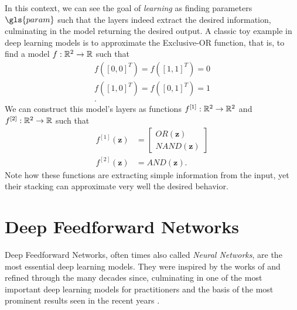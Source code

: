 In this context, we can see the goal of \textit{learning} as finding parameters $\gls{param}$ such that the layers indeed extract the desired information, culminating in the model returning the desired output.
A classic toy example in deep learning models is to approximate the Exclusive-OR function, that is, to find a model $f : \mathbb{R}^2 \to \mathbb{R}$ such that
\begin{align*}
    f([0,0]^T) = f([1,1]^T) = 0 \\
    f([1,0]^T) = f([0,1]^T) = 1 \\
.\end{align*}
We can construct this model's layers as functions $f^{[1]}:\mathbb{R}^2\to\mathbb{R}^2$ and $f^{[2]}:\mathbb{R}^2\to\mathbb{R}$ such that
\begin{align*}
    f^{[1]}(\bm{z}) &= \begin{bmatrix}
    OR(\bm{z}) \\
    NAND(\bm{z})
    \end{bmatrix} \\
    f^{[2]}(\bm{z}) &= AND(\bm{z})
.\end{align*}
Note how these functions are extracting simple information from the input, yet their stacking can approximate very well the desired behavior.

\section{Deep Feedforward Networks}\label{sec:neural-nets}

Deep Feedforward Networks, often times also called \emph{Neural Networks}\footnotemark, are the most essential deep learning models.
They were inspired by the works of \textcite{rosenblatt_perceptron_1957} and refined through the many decades since, culminating in one of the most important deep learning models for practitioners and the basis of the most prominent results seen in the recent years \cite{goodfellow_deep_2016}.

